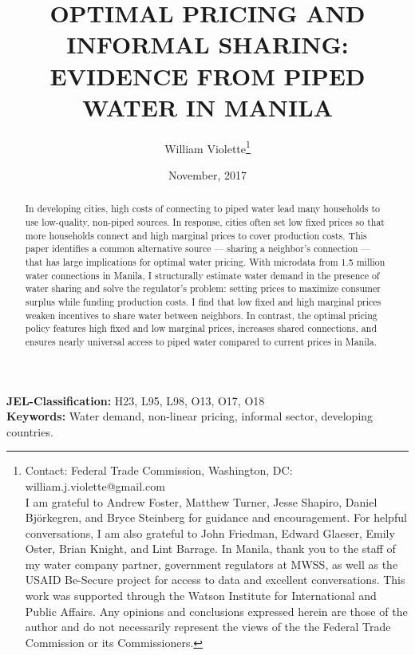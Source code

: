 \documentclass[12pt]{article}
\title{OPTIMAL PRICING AND INFORMAL SHARING: \\ EVIDENCE FROM PIPED WATER IN MANILA}
\author{William Violette\thanks{Contact: Federal Trade Commission, Washington, DC: william.j.violette@gmail.com \\ I am grateful to Andrew Foster, Matthew Turner, Jesse Shapiro, Daniel Bj\"{o}rkegren, and Bryce Steinberg for guidance and encouragement.  For helpful conversations, I am also grateful to John Friedman, Edward Glaeser, Emily Oster, Brian Knight, and Lint Barrage.  In Manila, thank you to the staff of my water company partner, government regulators at MWSS, as well as the USAID Be-Secure project for access to data and excellent conversations.  This work was supported through the Watson Institute for International and Public Affairs.  Any opinions and conclusions expressed herein are those of the author and do not necessarily represent the views of the the Federal Trade Commission or its Commissioners.}
 }
\date{November, 2017}
\begin{document}
\maketitle
\begin{abstract}


	In developing cities, high costs of connecting to piped water lead many households to use low-quality, non-piped sources.  In response, cities often set low fixed prices so that more households connect and high marginal prices to cover production costs.  This paper identifies a common alternative source --- sharing a neighbor's connection --- that has large implications for optimal water pricing.  With microdata from 1.5 million water connections in Manila, I structurally estimate water demand in the presence of water sharing and solve the regulator's problem: setting prices to maximize consumer surplus while funding production costs.  I find that low fixed and high marginal prices weaken incentives to share water between neighbors.  In contrast, the optimal pricing policy features high fixed and low marginal prices, increases shared connections, and ensures nearly universal access to piped water compared to current prices in Manila.


\end{abstract} 
\vspace{1cm}
{\bf JEL-Classification:} H23, L95, L98, O13, O17, O18 \\
\vspace{.1cm}
{\bf Keywords:} Water demand, non-linear pricing, informal sector, developing countries. 
\end{document}
